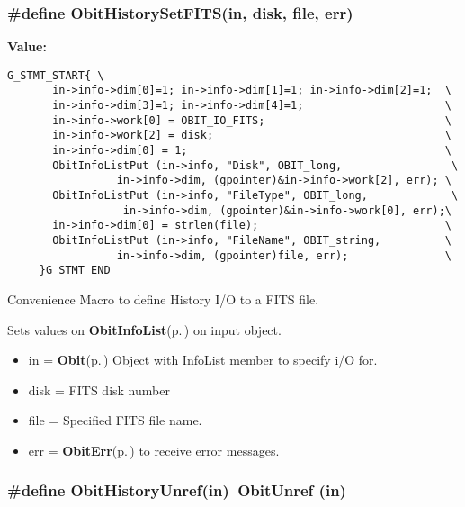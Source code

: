 \subsubsection{\setlength{\rightskip}{0pt plus 5cm}\#define Obit\-History\-Set\-FITS(in, disk, file, err)}\label{ObitHistory_8h_a3}


{\bf Value:}

\footnotesize\begin{verbatim}G_STMT_START{ \
       in->info->dim[0]=1; in->info->dim[1]=1; in->info->dim[2]=1;  \
       in->info->dim[3]=1; in->info->dim[4]=1;                      \
       in->info->work[0] = OBIT_IO_FITS;                            \
       in->info->work[2] = disk;                                    \
       in->info->dim[0] = 1;                                        \
       ObitInfoListPut (in->info, "Disk", OBIT_long,                 \
                 in->info->dim, (gpointer)&in->info->work[2], err); \
       ObitInfoListPut (in->info, "FileType", OBIT_long,             \
                  in->info->dim, (gpointer)&in->info->work[0], err);\
       in->info->dim[0] = strlen(file);                             \
       ObitInfoListPut (in->info, "FileName", OBIT_string,          \
                 in->info->dim, (gpointer)file, err);               \
     }G_STMT_END
\end{verbatim}\normalsize 
Convenience Macro to define History I/O to a FITS file. 

Sets values on {\bf Obit\-Info\-List}{\rm (p.\,\pageref{structObitInfoList})} on input object. \begin{itemize}
\item in = {\bf Obit}{\rm (p.\,\pageref{structObit})} Object with Info\-List member to specify i/O for. \item disk = FITS disk number \item file = Specified FITS file name. \item err = {\bf Obit\-Err}{\rm (p.\,\pageref{structObitErr})} to receive error messages. \end{itemize}
\subsubsection{\setlength{\rightskip}{0pt plus 5cm}\#define Obit\-History\-Unref(in)\ Obit\-Unref (in)}\label{ObitHistory_8h_a0}


